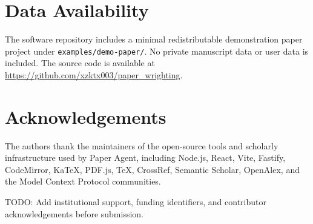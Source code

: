 \documentclass[11pt,a4paper]{article}
\newcommand{\software}{Paper Agent}
\newcommand{\repo}{\url{https://github.com/xzktx003/paper_wrighting}}
\begin{document}
\section*{Data Availability}

The software repository includes a minimal redistributable demonstration paper
project under \texttt{examples/demo-paper/}. No private manuscript data or user
data is included. The source code is available at \repo{}.

\section*{Acknowledgements}

The authors thank the maintainers of the open-source tools and scholarly
infrastructure used by \software{}, including Node.js, React, Vite, Fastify,
CodeMirror, KaTeX, PDF.js, \TeX{}, CrossRef, Semantic Scholar, OpenAlex, and
the Model Context Protocol communities.

{\small TODO: Add institutional support, funding identifiers, and contributor
acknowledgements before submission.}



\end{document}
